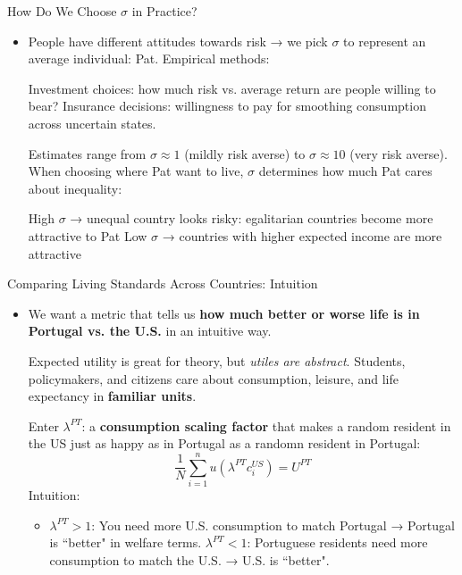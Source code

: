 \documentclass[10pt,aspectratio=169]{beamer}
\begin{document}
\begin{frame}{How Do We Choose \(\sigma\) in Practice?}
\begin{itemize}
  \item People have different attitudes towards risk → we pick \(\sigma\) to represent an average individual: Pat.
  \itemvso Empirical methods:
  \begin{itemize}
    \itemvso Investment choices: how much risk vs. average return are people willing to bear?
    \itemvso Insurance decisions: willingness to pay for smoothing consumption across uncertain states.
  \end{itemize}
  \itemvso Estimates range from \(\sigma \approx 1\) (mildly risk averse) to \(\sigma \approx 10\) (very risk averse).
  \itemvso When choosing where Pat want to live, \(\sigma\) determines how much Pat cares about inequality:
  \begin{itemize}
    \itemvso High \(\sigma\) → unequal country looks risky: egalitarian countries become more attractive to Pat
    \itemvso Low \(\sigma\) → countries with higher expected income are more attractive
  \end{itemize}
\end{itemize}
\end{frame}


\begin{frame}{Comparing Living Standards Across Countries: Intuition}

\begin{itemize}
  \item We want a metric that tells us \textbf{how much better or worse life is in Portugal vs. the U.S.} in an intuitive way.
  
  \itemvso Expected utility is great for theory, but \emph{utiles are abstract}. Students, policymakers, and citizens care about consumption, leisure, and life expectancy in \textbf{familiar units}.
  
  \itemvso Enter \(\lambda^{PT}\): a \textbf{consumption scaling factor} that makes a random resident in the US just as happy as in Portugal as a randomn resident in Portugal:
  \[
   \dfrac{1}{N}\sum_{i=1}^n u(\lambda^{PT} c_i^{US}) = U^{PT}
  \]
  \vspace{-1.5em}
  \itemvso Intuition:
  \begin{itemize}
    \item \(\lambda^{PT} > 1\): You need more U.S. consumption to match Portugal → Portugal is ``better" in welfare terms.
    \itemvso \(\lambda^{PT} < 1\): Portuguese residents need more consumption to match the U.S. → U.S. is ``better".
  \end{itemize}
\end{itemize}

\end{frame}
\end{document}

